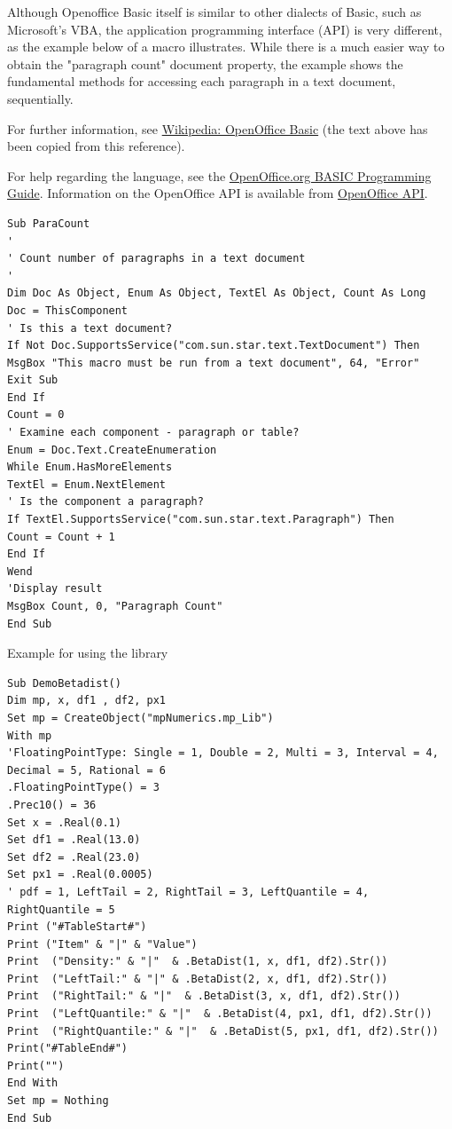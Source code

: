 \vpara
Although Openoffice Basic itself is similar to other dialects of Basic, such as Microsoft's VBA, the application programming interface (API) is very different, as the example below of a macro illustrates. While there is a much easier way to obtain the "paragraph count" document property, the example shows the fundamental methods for accessing each paragraph in a text document, sequentially.

\vpara
For further information, see \href{http://en.wikipedia.org/wiki/OpenOffice_Basic}{Wikipedia: OpenOffice Basic} (the text above has been copied from this reference).

\vpara
For help regarding the language, see the \href{http://wiki.openoffice.org/wiki/Documentation/BASIC_Guide}{OpenOffice.org BASIC Programming Guide}.
Information on the OpenOffice API is available from  \href{http://www.openoffice.org/api/}{OpenOffice API}.

\begin{lstlisting}
Sub ParaCount
'
' Count number of paragraphs in a text document
'
Dim Doc As Object, Enum As Object, TextEl As Object, Count As Long
Doc = ThisComponent
' Is this a text document?
If Not Doc.SupportsService("com.sun.star.text.TextDocument") Then
MsgBox "This macro must be run from a text document", 64, "Error"
Exit Sub
End If
Count = 0
' Examine each component - paragraph or table?
Enum = Doc.Text.CreateEnumeration
While Enum.HasMoreElements
TextEl = Enum.NextElement
' Is the component a paragraph?
If TextEl.SupportsService("com.sun.star.text.Paragraph") Then
Count = Count + 1
End If
Wend
'Display result
MsgBox Count, 0, "Paragraph Count"
End Sub
\end{lstlisting}


\noindent Example for using the library

\begin{lstlisting}
Sub DemoBetadist()
Dim mp, x, df1 , df2, px1 
Set mp = CreateObject("mpNumerics.mp_Lib")
With mp
'FloatingPointType: Single = 1, Double = 2, Multi = 3, Interval = 4, Decimal = 5, Rational = 6
.FloatingPointType() = 3
.Prec10() = 36
Set x = .Real(0.1)
Set df1 = .Real(13.0)
Set df2 = .Real(23.0)
Set px1 = .Real(0.0005)	
' pdf = 1, LeftTail = 2, RightTail = 3, LeftQuantile = 4, RightQuantile = 5
Print ("#TableStart#")
Print ("Item" & "|" & "Value")
Print  ("Density:" & "|"  & .BetaDist(1, x, df1, df2).Str())
Print  ("LeftTail:" & "|" & .BetaDist(2, x, df1, df2).Str())
Print  ("RightTail:" & "|"  & .BetaDist(3, x, df1, df2).Str())
Print  ("LeftQuantile:" & "|"  & .BetaDist(4, px1, df1, df2).Str())
Print  ("RightQuantile:" & "|"  & .BetaDist(5, px1, df1, df2).Str())
Print("#TableEnd#")
Print("")
End With
Set mp = Nothing
End Sub\end{lstlisting}





